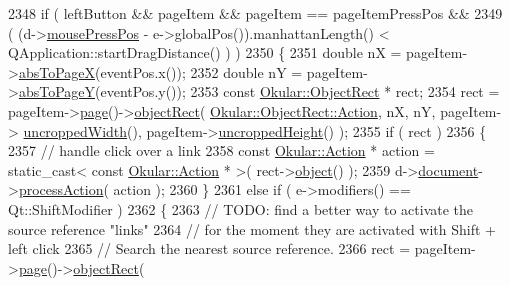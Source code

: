 \begin{DoxyCode}
2348             \textcolor{keywordflow}{if} ( leftButton && pageItem && pageItem == pageItemPressPos &&
2349                  ( (d->\hyperlink{classPageViewPrivate_aa4799ae3aa24957d19a95220d8f61216}{mousePressPos} - e->globalPos()).manhattanLength() < 
      QApplication::startDragDistance() ) )
2350             \{
2351                 \textcolor{keywordtype}{double} nX = pageItem->\hyperlink{classPageViewItem_ac8c32541cbae1efd5b4ab54f0a4b4576}{absToPageX}(eventPos.x());
2352                 \textcolor{keywordtype}{double} nY = pageItem->\hyperlink{classPageViewItem_afdbba9ce015155c0e655efbb23e5d13b}{absToPageY}(eventPos.y());
2353                 \textcolor{keyword}{const} \hyperlink{classOkular_1_1ObjectRect}{Okular::ObjectRect} * rect;
2354                 rect = pageItem->\hyperlink{classPageViewItem_a5c512d95e5563e8d19d1fb3d93dafc31}{page}()->\hyperlink{classOkular_1_1Page_ab6a680a31a5d67861013d706d028dde7}{objectRect}( 
      \hyperlink{classOkular_1_1ObjectRect_a2f77f7653306bae90bfb68277aaafe16a2ad02138861dfdc8bc2a0c29bae5bed2}{Okular::ObjectRect::Action}, nX, nY, pageItem->
      \hyperlink{classPageViewItem_a240924407ae22bb0489363a6a2d481b9}{uncroppedWidth}(), pageItem->\hyperlink{classPageViewItem_af1380fce5dc13a72458ef834c720b128}{uncroppedHeight}() );
2355                 \textcolor{keywordflow}{if} ( rect )
2356                 \{
2357                     \textcolor{comment}{// handle click over a link}
2358                     \textcolor{keyword}{const} \hyperlink{classOkular_1_1Action}{Okular::Action} * action = \textcolor{keyword}{static\_cast<} \textcolor{keyword}{const }
      \hyperlink{classOkular_1_1Action}{Okular::Action} * \textcolor{keyword}{>}( rect->\hyperlink{classOkular_1_1ObjectRect_abb2a3c95452ae753a33f3f5c73391374}{object}() );
2359                     d->\hyperlink{classPageViewPrivate_a50645b9853306cffd74e51efb677e5b4}{document}->\hyperlink{classOkular_1_1Document_aabdf41f40fe0391590391e303891b5ed}{processAction}( action );
2360                 \}
2361                 \textcolor{keywordflow}{else} \textcolor{keywordflow}{if} ( e->modifiers() == Qt::ShiftModifier )
2362                 \{
2363                     \textcolor{comment}{// TODO: find a better way to activate the source reference "links"}
2364                     \textcolor{comment}{// for the moment they are activated with Shift + left click}
2365                     \textcolor{comment}{// Search the nearest source reference.}
2366                     rect = pageItem->\hyperlink{classPageViewItem_a5c512d95e5563e8d19d1fb3d93dafc31}{page}()->\hyperlink{classOkular_1_1Page_ab6a680a31a5d67861013d706d028dde7}{objectRect}( 

\end{DoxyCode}
